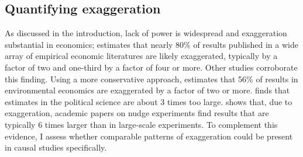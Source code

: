 \documentclass[usletter, 12pt]{article}
\begin{document}
				 
		 
	                \subsection{Quantifying exaggeration}
	                
	                	 	As discussed in the introduction, lack of power is widespread and exaggeration substantial in economics; \cite{ioannidis_power_2017} estimates that nearly 80\% of results published in a wide array of empirical economic literatures are likely exaggerated, typically by a factor of two and one-third by a factor of four or more. Other studies corroborate this finding. Using a more conservative approach, \cite{ferraro_feature_2020} estimates that 56\% of results in environmental economics are exaggerated by a factor of two or more. \cite{arel-bundock_quantitative_2024} finds that estimates in the political science are about 3 times too large. \cite{dellavigna_rcts_2022} shows that, due to exaggeration, academic papers on nudge experiments find results that are typically 6 times larger than in large-scale experiments. To complement this evidence, I assess whether comparable patterns of exaggeration could be present in causal studies specifically.
			
\end{document}

